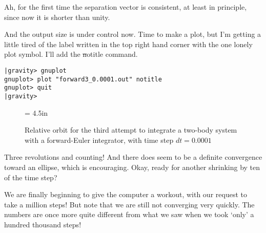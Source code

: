 \abc

\bob
Ah, for the first time the separation vector is consistent, at least
in principle, since now it is shorter than unity.

\carol
And the output size is under control now.  Time to make a plot, but
I'm getting a little tired of the label written in the top right hand
corner with the one lonely plot symbol.  I'll add the {\st notitle}
command.

\cba

\begin{small}
\begin{verbatim}
|gravity> gnuplot
gnuplot> plot "forward3_0.0001.out" notitle
gnuplot> quit
|gravity> 
\end{verbatim}
\end{small}

\begin{figure}[ht]
\begin{center}
\epsfxsize = 4.5in
\caption[Two-body orbit with a forward-Euler integrator, time step
$dt = 0.0001$]
{Relative orbit for the third attempt to integrate a two-body system with a
forward-Euler integrator, with time step $dt = 0.0001$}
\label{fig:forward3-0.0001}
\end{center}
\end{figure}

\abc

\carol
Three revolutions and counting!  And there does seem to be a definite
convergence toward an ellipse, which is encouraging.  Okay, ready for
another shrinking by ten of the time step?

\cba


\abc

\bob
We are finally beginning to give the computer a workout, with our
request to take a million steps!  But note that we are still not
converging very quickly.  The numbers are once more quite different
from what we saw when we took `only' a hundred thousand steps!

